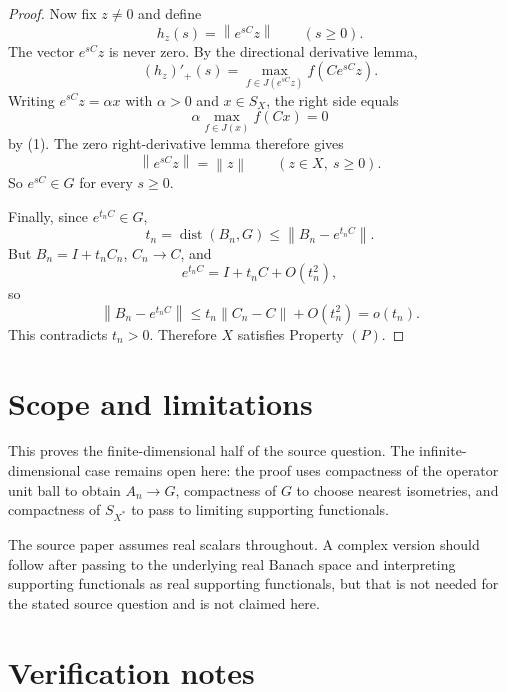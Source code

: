 \documentclass[11pt]{article}
\newcommand{\SX}{S_X}
\newcommand{\dist}{\operatorname{dist}}
\newcommand{\norm}[1]{\left\lVert #1 \right\rVert}
\begin{document}
\begin{proof}
Now fix \(z\ne0\) and define
\[
  h_z(s)=\norm{e^{sC}z}\qquad(s\ge0).
\]
The vector \(e^{sC}z\) is never zero.  By the directional derivative lemma,
\[
  (h_z)'_+(s)
  =\max_{f\in J(e^{sC}z)} f(Ce^{sC}z).
\]
Writing \(e^{sC}z=\alpha x\) with \(\alpha>0\) and \(x\in\SX\), the right side
equals
\[
  \alpha\max_{f\in J(x)}f(Cx)=0
\]
by (1).  The zero right-derivative lemma therefore gives
\[
  \norm{e^{sC}z}=\norm{z}\qquad(z\in X,\ s\ge0).
\]
So \(e^{sC}\in G\) for every \(s\ge0\).

Finally, since \(e^{t_nC}\in G\),
\[
  t_n=\dist(B_n,G)\le \norm{B_n-e^{t_nC}}.
\]
But \(B_n=I+t_nC_n\), \(C_n\to C\), and
\[
  e^{t_nC}=I+t_nC+O(t_n^2),
\]
so
\[
  \norm{B_n-e^{t_nC}}
  \le t_n\norm{C_n-C}+O(t_n^2)=o(t_n).
\]
This contradicts \(t_n>0\).  Therefore \(X\) satisfies Property \((P)\).
\end{proof}

\section*{Scope and limitations}

This proves the finite-dimensional half of the source question.  The
infinite-dimensional case remains open here: the proof uses compactness of the
operator unit ball to obtain \(A_n\to G\), compactness of \(G\) to choose
nearest isometries, and compactness of \(S_{X^*}\) to pass to limiting
supporting functionals.

The source paper assumes real scalars throughout.  A complex version should
follow after passing to the underlying real Banach space and interpreting
supporting functionals as real supporting functionals, but that is not needed
for the stated source question and is not claimed here.

\section*{Verification notes}
\end{document}
